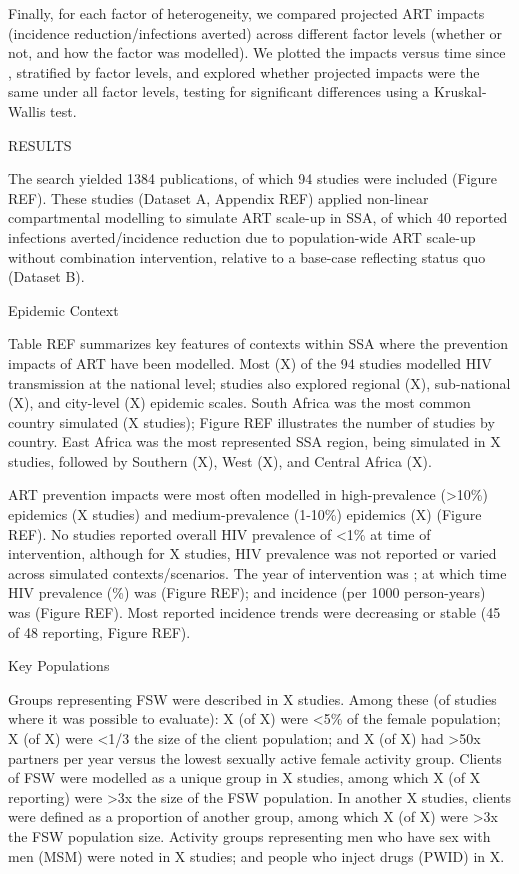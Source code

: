Finally, for each factor of heterogeneity,
we compared projected ART impacts (incidence reduction/infections averted)
across different factor levels (whether or not, and how the factor was modelled).
We plotted the impacts versus time since , stratified by factor levels,
and explored whether projected impacts were the same under all factor levels,
testing for significant differences using a Kruskal-Wallis test.

RESULTS

The search yielded 1384 publications,
of which 94 studies were included (Figure REF).
These studies (Dataset A, Appendix REF)
applied non-linear compartmental modelling to simulate ART scale-up in SSA,
of which 40 reported infections averted/incidence reduction
due to population-wide ART scale-up without combination intervention,
relative to a base-case reflecting status quo (Dataset B).

Epidemic Context

Table REF summarizes key features of contexts within SSA
where the prevention impacts of ART have been modelled.
Most (X) of the 94 studies modelled HIV transmission at the national level;
studies also explored
regional (X),
sub-national (X), and
city-level (X) epidemic scales.
South Africa was the most common country simulated (X studies);
Figure REF illustrates the number of studies by country.
East Africa was the most represented SSA region, being simulated in X studies,
followed by Southern (X), West (X), and Central Africa (X).

ART prevention impacts were most often modelled in
high-prevalence ({>10\%}) epidemics (X studies) and
medium-prevalence ({1-10\%}) epidemics (X) (Figure REF).
No studies reported overall HIV prevalence of {<1\%} at time of intervention,
although for X studies, HIV prevalence was
not reported or varied across simulated contexts/scenarios.
The \xdmdef year of intervention was ; at which time
HIV prevalence (\%) was  (Figure REF); and
incidence (per 1000 person-years) was  (Figure REF).
Most reported incidence trends were decreasing or stable
(45 of 48 reporting, Figure REF). 

Key Populations

Groups representing FSW were described in X studies.
Among these (of studies where it was possible to evaluate):
X (of X) were {<5\%} of the female population;
X (of X) were {<1/3} the size of the client population; and
X (of X) had {>50x} partners per year versus
the lowest sexually active female activity group.
Clients of FSW were modelled as a unique group in X studies,
among which X (of X reporting)
were {>3x} the size of the FSW population.
In another X studies, clients were defined as a proportion of another group,
among which X (of X)
were {>3x} the FSW population size.
Activity groups representing
men who have sex with men (MSM) were noted in X studies; and
people who inject drugs (PWID) in X.

